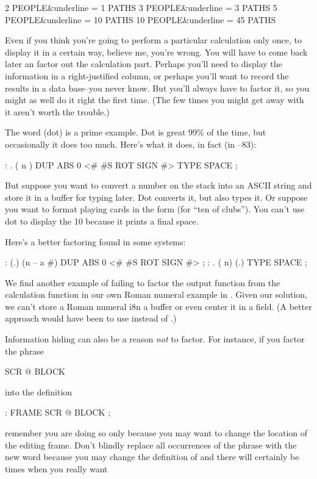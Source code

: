 \begin{Code}[commandchars=\&\{\}]
2 PEOPLE&underline{ = 1 PATHS}
3 PEOPLE&underline{ = 3 PATHS}
5 PEOPLE&underline{ = 10 PATHS}
10 PEOPLE&underline{ = 45 PATHS}
\end{Code}
Even if you think you're going to perform a particular calculation
only once, to display it in a certain way, believe me, you're wrong.
You will have to come back later an factor out the calculation part.
Perhaps you'll need to display the information in a right-justified
column, or perhaps you'll want to record the results in a data
base--you never know. But you'll always have to factor it, so you
might as well do it right the first time. (The few times you might get
away with it aren't worth the trouble.)

The word  (dot) is a prime example. Dot is great 99\% of the
time, but occasionally it does too much. Here's what it does, in fact
(in \Forth{}--83):

\begin{Code}
: .   ( n )  DUP ABS 0 <# #S  ROT SIGN  #> TYPE SPACE ;
\end{Code}
But suppose you want to convert a number on the stack into an ASCII
string and store it in a buffer for typing later. Dot converts it, but
also types it. Or suppose you want to format playing cards in the form
 (for ``ten of clubs''). You can't use dot to display the 10
because it prints a final space.

Here's a better factoring found in some \Forth{} systems:

\begin{Code}
: (.)  (n -- a #)  DUP ABS 0  <# #S  ROT SIGN  #> ;
: .  ( n)  (.) TYPE SPACE ;
\end{Code}
We find another example of failing to factor the output function from
the calculation function in our own Roman numeral example in .
Given our solution, we can't store a Roman numeral i8n a buffer or
even center it in a field. (A better approach would have been to use
 instead of .)

Information hiding can also be a reason \emph{not} to factor. For
instance, if you factor the phrase

\begin{Code}
SCR @ BLOCK
\end{Code}
into the definition

\begin{Code}
: FRAME   SCR @ BLOCK ;
\end{Code}
remember you are doing so only because you may want to change the
location of the editing frame. Don't blindly replace all occurrences
of the phrase with the new word  because you may change the
definition of  and there will certainly be times when you really
want 

